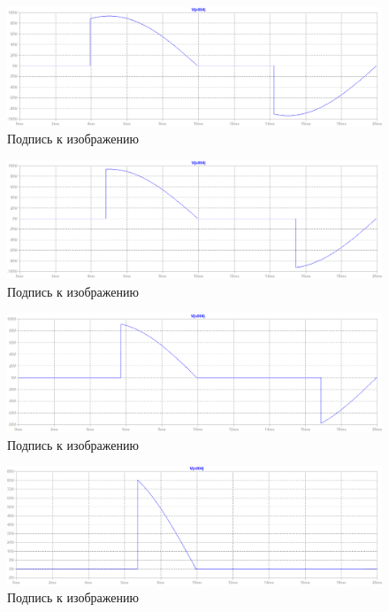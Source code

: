 \documentclass[a4paper, 12pt]{article}
\begin{document}
    \begin{figure}[H]
        \centering
        \includegraphics[scale=0.45]{R2-110k.png}
        \captionsetup{skip=0pt}
        \caption{Подпись к изображению}
        \label{fig:R2-110k}
    \end{figure}
    \begin{figure}[H]
        \centering
        \includegraphics[scale=0.45]{R2-160k.png}
        \captionsetup{skip=0pt}
        \caption{Подпись к изображению}
        \label{fig:R2-160k}
    \end{figure}
    \begin{figure}[H]
        \centering
        \includegraphics[scale=0.45]{R2-210k.png}
        \captionsetup{skip=0pt}
        \caption{Подпись к изображению}
        \label{fig:R2-210k}
    \end{figure}
    \begin{figure}[H]
        \centering
        \includegraphics[scale=0.45]{R2-260k.png}
        \captionsetup{skip=0pt}
        \caption{Подпись к изображению}
        \label{fig:R2-260k}
    \end{figure}
\end{document}
